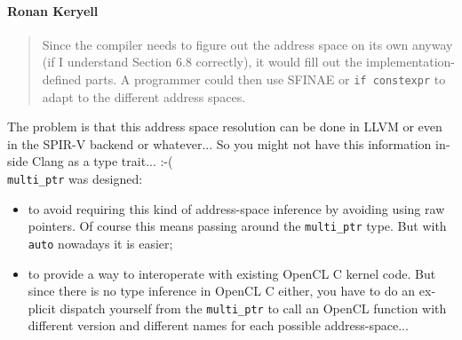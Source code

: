 \begin{otherlanguage}{english}
    \paragraph{Ronan Keryell} \begin{quote}
                                Since the compiler needs to figure out the
                                address space on its own anyway (if I understand
                                Section 6.8 correctly), it would fill out the
                                implementation-defined parts. A programmer could
                                then use SFINAE or \texttt{if constexpr} to
                                adapt to the different address spaces.
                              \end{quote}
                              The problem is that this address space resolution
                              can be done in LLVM or even in the SPIR-V backend
                              or whatever... So you might not have this
                              information inside Clang as a type trait... :-(
                              \\
                              \texttt{multi\_ptr} was designed:
                              \begin{itemize}
                                  \item to avoid requiring this kind of
                                        address-space inference by avoiding
                                        using raw pointers. Of course this means
                                        passing around the \texttt{multi\_ptr}
                                        type. But with \texttt{auto} nowadays it
                                        is easier;
                                  \item to provide a way to interoperate with
                                        existing OpenCL C kernel code. But since
                                        there is no type inference in OpenCL C
                                        either, you have to do an explicit
                                        dispatch yourself from the
                                        \texttt{multi\_ptr} to call an OpenCL
                                        function with different version and
                                        different names for each possible
                                        address-space...
                              \end{itemize}

\end{otherlanguage}
